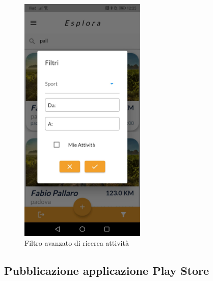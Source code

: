 \begin{figure}[htbp]	
	\centering
	\includegraphics[width=6cm]{immagini/filtroavanzato.jpeg}
	\caption{Filtro avanzato di ricerca attività}
	\label{fig:Filtro avanzato di ricerca attività}
\end{figure}

\newpage

\subsection{Pubblicazione applicazione Play Store}


